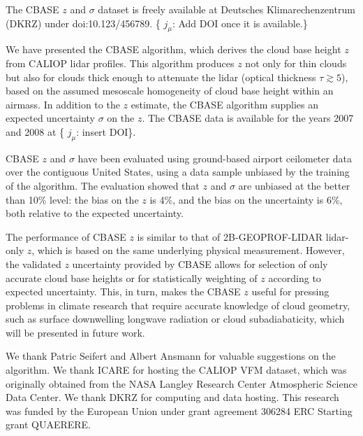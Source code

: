 \documentclass[essd,manuscript]{copernicus}\usepackage[]{graphicx}\usepackage[]{color}
\newcommand{\hlnum}[1]{\textcolor[rgb]{0.686,0.059,0.569}{#1}}%
\newcommand\comment[2]{\{\hlnum{ \textit{#1}: #2}\}}
\newcommand\commentjm[1]{\comment{$j_\mu$}{#1}}
\newcommand\CBH{\ensuremath{z}}
\begin{document}
The CBASE \CBH{} and $\sigma$ dataset \citep{cbase} is freely available at
Deutsches Klimarechenzentrum (DKRZ) under doi:10.123/456789.  \commentjm{Add DOI
once it is available.}

\conclusions
\label{sec:conclusions}

We have presented the CBASE algorithm, which derives the cloud base height \CBH{} from CALIOP lidar
profiles.  This algorithm produces \CBH{} not only for thin clouds but also for
clouds thick enough to attenuate the lidar (optical thickness $\tau \gtrsim 5$),
based on the assumed mesoscale homogeneity of cloud base height within an
airmass.  In addition to the \CBH{} estimate, the CBASE algorithm supplies an
expected uncertainty $\sigma$ on the \CBH{}.  The CBASE data is available for the years 2007
and 2008 at \commentjm{insert DOI}.

CBASE \CBH{} and $\sigma$ have been evaluated using
ground-based airport ceilometer data over the contiguous United States, using a
data sample unbiased by the training of the algorithm.  The evaluation showed that
\CBH{} and $\sigma$ are unbiased at the better
than 10\% level: the bias on the \CBH{} is %
4\%,
and the bias on the uncertainty is %
6\%, both relative to the expected uncertainty.

The performance of CBASE \CBH{} is similar to that of 2B-GEOPROF-LIDAR
lidar-only \CBH{}, which is based on the same underlying physical measurement.
However, the validated \CBH{} uncertainty provided by CBASE allows for selection
of only accurate cloud base heights or for statistically weighting of \CBH{}
according to expected uncertainty.  This, in turn, makes the CBASE \CBH{} useful
for pressing problems in climate research that require accurate knowledge of
cloud geometry, such as surface downwelling longwave radiation or cloud
subadiabaticity, which will be presented in future work.

\begin{acknowledgements}
  We thank Patric Seifert and Albert Ansmann for valuable suggestions on the
  algorithm.  We thank ICARE for hosting the CALIOP VFM dataset, which was
  originally obtained from the NASA Langley Research Center Atmospheric Science
  Data Center.  We thank DKRZ for computing and data hosting.  This research was
  funded by the European Union under grant agreement 306284 ERC Starting grant
  QUAERERE.
\end{acknowledgements}



\end{document}
